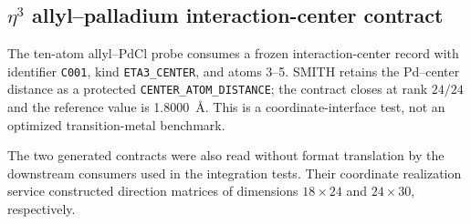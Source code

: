 \documentclass[10pt]{article}
\newcommand{\SMITH}{\textsc{SMITH}}
\begin{document}




\subsection{\texorpdfstring{$\eta^3$}{eta3} allyl--palladium interaction-center contract}

The ten-atom allyl--PdCl probe consumes a frozen interaction-center record with
identifier \texttt{C001}, kind \texttt{ETA3\_CENTER}, and atoms 3--5.  \SMITH
retains the Pd--center distance as a protected
\texttt{CENTER\_ATOM\_DISTANCE}; the contract closes at rank \(24/24\) and the
reference value is 1.8000~\AA.  This is a coordinate-interface test, not an
optimized transition-metal benchmark.





The two generated contracts were also read without format translation by the
downstream consumers used in the integration tests.  Their coordinate
realization service constructed direction matrices of dimensions
\(18\times24\) and \(24\times30\), respectively.
\end{document}
